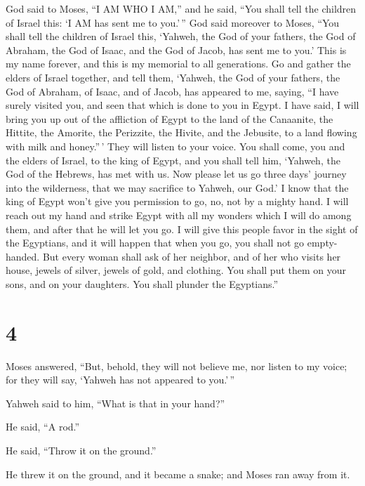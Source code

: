  God said to Moses, ``I AM WHO I AM,'' and he said, ``You
shall tell the children of Israel this: `I AM has sent me to you.'\,''
 God said moreover to Moses, ``You shall tell the children
of Israel this, `Yahweh, the God of your fathers, the God of Abraham,
the God of Isaac, and the God of Jacob, has sent me to you.' This is my
name forever, and this is my memorial to all generations. 
Go and gather the elders of Israel together, and tell them, `Yahweh, the
God of your fathers, the God of Abraham, of Isaac, and of Jacob, has
appeared to me, saying, ``I have surely visited you, and seen that which
is done to you in Egypt.  I have said, I will bring you up
out of the affliction of Egypt to the land of the Canaanite, the
Hittite, the Amorite, the Perizzite, the Hivite, and the Jebusite, to a
land flowing with milk and honey.''\,'  They will listen to
your voice. You shall come, you and the elders of Israel, to the king of
Egypt, and you shall tell him, `Yahweh, the God of the Hebrews, has met
with us. Now please let us go three days' journey into the wilderness,
that we may sacrifice to Yahweh, our God.'  I know that the
king of Egypt won't give you permission to go, no, not by a mighty hand.
 I will reach out my hand and strike Egypt with all my
wonders which I will do among them, and after that he will let you go.
 I will give this people favor in the sight of the
Egyptians, and it will happen that when you go, you shall not go
empty-handed.  But every woman shall ask of her neighbor,
and of her who visits her house, jewels of silver, jewels of gold, and
clothing. You shall put them on your sons, and on your daughters. You
shall plunder the Egyptians.''

\hypertarget{section-3}{%
\section{4}\label{section-3}}

 Moses answered, ``But, behold, they will not believe me,
nor listen to my voice; for they will say, `Yahweh has not appeared to
you.'\,''

 Yahweh said to him, ``What is that in your hand?''

He said, ``A rod.''

 He said, ``Throw it on the ground.''

He threw it on the ground, and it became a snake; and Moses ran away
from it.

